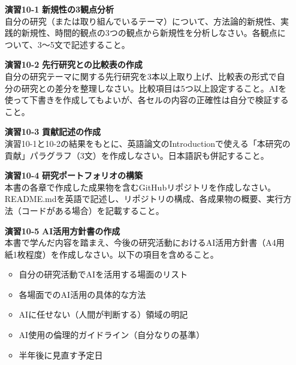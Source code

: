\begin{enumerate}
\item[\textbf{演習10-1}] \textbf{新規性の3観点分析}\\
自分の研究（または取り組んでいるテーマ）について、方法論的新規性、実践的新規性、時間的観点の3つの観点から新規性を分析しなさい。各観点について、3〜5文で記述すること。

\item[\textbf{演習10-2}] \textbf{先行研究との比較表の作成}\\
自分の研究テーマに関する先行研究を3本以上取り上げ、比較表の形式で自分の研究との差分を整理しなさい。比較項目は5つ以上設定すること。AIを使って下書きを作成してもよいが、各セルの内容の正確性は自分で検証すること。

\item[\textbf{演習10-3}] \textbf{貢献記述の作成}\\
演習10-1と10-2の結果をもとに、英語論文のIntroductionで使える「本研究の貢献」パラグラフ（3文）を作成しなさい。日本語訳も併記すること。

\item[\textbf{演習10-4}] \textbf{研究ポートフォリオの構築}\\
本書の各章で作成した成果物を含むGitHubリポジトリを作成しなさい。README.mdを英語で記述し、リポジトリの構成、各成果物の概要、実行方法（コードがある場合）を記載すること。

\item[\textbf{演習10-5}] \textbf{AI活用方針書の作成}\\
本書で学んだ内容を踏まえ、今後の研究活動におけるAI活用方針書（A4用紙1枚程度）を作成しなさい。以下の項目を含めること。
\begin{itemize}
\item 自分の研究活動でAIを活用する場面のリスト
\item 各場面でのAI活用の具体的な方法
\item AIに任せない（人間が判断する）領域の明記
\item AI使用の倫理的ガイドライン（自分なりの基準）
\item 半年後に見直す予定日
\end{itemize}
\end{enumerate}
